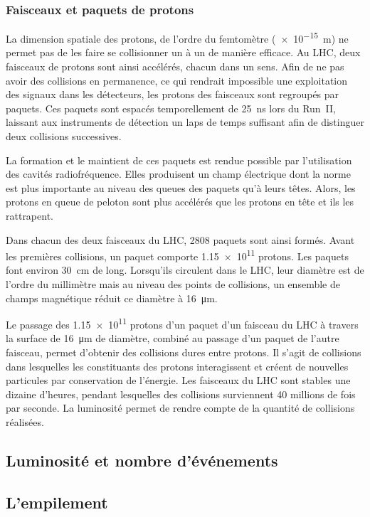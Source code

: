 \subsubsection{Faisceaux et paquets de protons}
La dimension spatiale des protons, de l'ordre du femtomètre (\SI{e-15}{\meter}) ne permet pas de les faire se collisionner un à un de manière efficace.
Au LHC, deux faisceaux de protons sont ainsi accélérés, chacun dans un sens.
Afin de ne pas avoir des collisions en permanence, ce qui rendrait impossible une exploitation des signaux dans les détecteurs, les protons des faisceaux sont regroupés par paquets.
Ces paquets sont espacés temporellement de \SI{25}{\nano\second} lors du Run~II, laissant aux instruments de détection un laps de temps suffisant afin de distinguer deux collisions successives.
\par La formation et le maintient de ces paquets est rendue possible par l'utilisation des cavités radiofréquence.
Elles produisent un champ électrique dont la norme est plus importante au niveau des queues des paquets qu'à leurs têtes.
Alors, les protons \og en queue de peloton \fg{} sont plus accélérés que les protons en tête et ils les rattrapent.
\par Dans chacun des deux faisceaux du LHC, 2808 paquets sont ainsi formés.
Avant les premières collisions, un paquet comporte \num{1.15e11} protons.
Les paquets font environ \SI{30}{\centi\meter} de long.
Lorsqu'ils circulent dans le LHC, leur diamètre est de l'ordre du millimètre mais au niveau des points de collisions, un ensemble de champs magnétique réduit ce diamètre à \SI{16}{\micro\meter}.
\par Le passage des \num{1.15e11} protons d'un paquet d'un faisceau du LHC à travers la surface de \SI{16}{\micro\meter} de diamètre, combiné au passage d'un paquet de l'autre faisceau, permet d'obtenir des collisions dures entre protons.
Il s'agit de collisions dans lesquelles les constituants des protons interagissent et créent de nouvelles particules par conservation de l'énergie.
Les faisceaux du LHC sont stables une dizaine d'heures, pendant lesquelles des collisions surviennent 40 millions de fois par seconde.
La luminosité permet de rendre compte de la quantité de collisions réalisées.
\subsection{Luminosité et nombre d'événements}\label{chapter-LHC-section-LHC-subsec-lumi}

\subsection{L'empilement}\label{chapter-LHC-section-LHC-subsec-PU}

